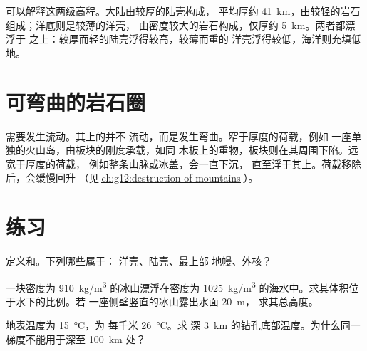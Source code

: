 可以解释这两级高程。大陆由较厚的陆壳构成，
平均厚约 \qty{41}{km}，由较轻的岩石组成；洋底则是较薄的洋壳，
由密度较大的岩石构成，仅厚约 \qty{5}{km}。两者都漂浮于
之上：较厚而轻的陆壳浮得较高，较薄而重的
洋壳浮得较低，海洋则充填低地。

\section{可弯曲的岩石圈}

需要发生流动。其上的并不
流动，而是发生弯曲。窄于厚度的荷载，例如
一座单独的火山岛，由板块的刚度承载，如同
木板上的重物，板块则在其周围下陷。远宽于厚度的荷载，
例如整条山脉或冰盖，会一直下沉，
直至浮于其上。荷载移除后，会缓慢回升
（见\cref{ch:g12:destruction-of-mountains}）。

\section{练习}

\begin{exercise}[$\star$]\label{exo:g11:lithosphere-asthenosphere:1}
定义和。下列哪些属于：
洋壳、陆壳、最上部
地幔、外核？
\end{exercise}

\begin{exercise}[$\star$]\label{exo:g11:lithosphere-asthenosphere:2}
一块密度为 \qty{910}{kg/m^3} 的冰山漂浮在密度为
\qty{1025}{kg/m^3} 的海水中。求其体积位于水下的比例。若
一座侧壁竖直的冰山露出水面 \qty{20}{m}，
求其总高度。
\end{exercise}

\begin{exercise}[$\star$]\label{exo:g11:lithosphere-asthenosphere:3}
地表温度为 \qty{15}{\celsius}，为
每千米 \qty{26}{\celsius}。求
深 \qty{3}{km} 的钻孔底部温度。为什么同一梯度不能用于深至
\qty{100}{km} 处？
\end{exercise}

